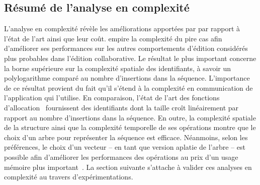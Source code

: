 \subsection{Résumé de l'analyse en complexité}

L'analyse en complexité révèle les améliorations apportées par \LSEQ par rapport
à l'état de l'art ainsi que leur coût. \LSEQ empire la complexité du pire cas
afin d'améliorer ses performances sur les autres comportements d'édition
considérés plus probables dans l'édition collaborative. Le résultat le plus
important concerne la borne supérieure sur la complexité spatiale des
identifiants, à savoir un polylogarithme comparé au nombre d'insertions dans la
séquence. L'importance de ce résultat provient du fait qu'il s'étend à la
complexité en communication de l'application qui l'utilise. En comparaison,
l'état de l'art des fonctions d'allocation~\cite{preguica2009commutative,
  weiss2009logoot} fournissent des identifiants dont la taille croît
linéairement par rapport au nombre d'insertions dans la séquence.  En outre, la
complexité spatiale de la structure ainsi que la complexité temporelle de ses
opérations montre que le choix d'un arbre pour représenter la séquence est
efficace. Néanmoins, selon les préférences, le choix d'un vecteur -- en tant que
version aplatie de l'arbre -- est possible afin d'améliorer les performances
des opérations au prix d'un usage mémoire plus
important~\cite{weiss2009logoot}. La section suivante s'attache à valider ces
analyses en complexité au travers d'expérimentations.



%       

